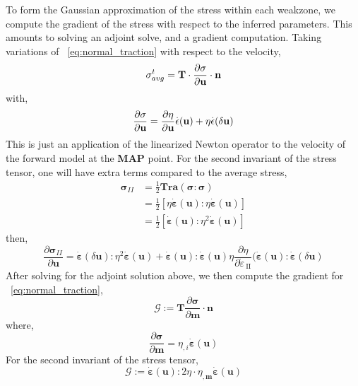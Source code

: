 \documentclass[12pt]{article}
\newcommand{\IIinv}{{\dot\varepsilon}_{\mathrm{\!\!\:II}}}
\newcommand{\mm}{{\ensuremath{\boldsymbol{m}}}}
\newcommand{\uu}{{\ensuremath{\boldsymbol{u}}}}
\newcommand{\ssigma}{{\ensuremath{\boldsymbol{\sigma}}}}
\newcommand{\strain}{{\ensuremath{\dot{\boldsymbol{\varepsilon}}}}}
\begin{document}
To form the Gaussian approximation of the stress within each weakzone, we compute the gradient of the stress with respect to the inferred parameters. This amounts to solving an adjoint solve, and a gradient computation. Taking variations of ~\eqref{eq:normal_traction} with respect to the velocity,
\begin{equation}
\sigma^t_{avg}=\textbf{T}\cdot\frac{\partial\sigma}{\partial \textbf u}\cdot \textbf n
\end{equation}
with,
\begin{equation}
\frac{\partial\sigma}{\partial \textbf u} = \frac{\partial \eta}{\partial \textbf u}\overset{.}{\epsilon}(\textbf u)
                                            + \eta\overset{.}{\epsilon}(\delta \textbf u)
\end{equation}
This is just an application of the linearized Newton operator to the velocity of the forward model at the \textbf{MAP} point.
For the second invariant of the stress tensor, one will have extra terms compared to the average stress,
\begin{equation}
  \begin{split}
 \ssigma_{II}& = \frac{1}{2}\textbf{Tra}(\ssigma:\ssigma) \\
 & = \frac{1}{2}[\eta\strain(\uu):\eta\strain(\uu)]\\
             & = \frac{1}{2}[\strain(\uu):\eta^2\strain(\uu)]
\end{split}
\end{equation}
then,
\begin{equation}
    \frac{\partial \ssigma_{II}}{\partial \uu} = \strain(\delta \uu):\eta^2\strain(\uu) +
 \strain(\uu):\strain(\uu)\eta\frac{\partial\eta}{\partial \IIinv}(\strain(\uu):\strain(\delta\uu)
\end{equation}
After solving for the adjoint solution above, we then compute the gradient for ~\eqref{eq:normal_traction},
\begin{equation}
\mathcal{G}:=  \textbf{T}\frac{\partial{\ssigma}}{{\partial \mm}}\cdot \textbf{n}
\end{equation}
where,
\begin{equation}
\frac{\partial \ssigma}{\partial \mm} = \eta_{,i}\strain(\uu)
\end{equation}
For the second invariant of the stress tensor, 
\begin{equation}
\mathcal G:=  \strain(\uu):2\eta\cdot\eta_{,\mm}\strain(\uu)
\end{equation}
\end{document}
